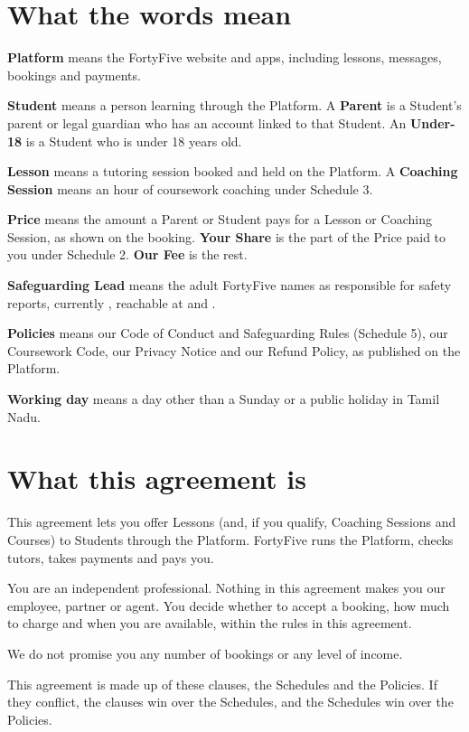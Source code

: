 \documentclass[11pt]{article}
\begin{document}
\section{What the words mean}

\begin{clauses}
  \item \textbf{Platform} means the FortyFive website and apps, including lessons, messages, bookings and payments.
  \item \textbf{Student} means a person learning through the Platform. A \textbf{Parent} is a Student's parent or legal guardian who has an account linked to that Student. An \textbf{Under-18} is a Student who is under 18 years old.
  \item \textbf{Lesson} means a tutoring session booked and held on the Platform. A \textbf{Coaching Session} means an hour of coursework coaching under Schedule 3.
  \item \textbf{Price} means the amount a Parent or Student pays for a Lesson or Coaching Session, as shown on the booking. \textbf{Your Share} is the part of the Price paid to you under Schedule 2. \textbf{Our Fee} is the rest.
  \item \textbf{Safeguarding Lead} means the adult FortyFive names as responsible for safety reports, currently , reachable at  and .
  \item \textbf{Policies} means our Code of Conduct and Safeguarding Rules (Schedule 5), our Coursework Code, our Privacy Notice and our Refund Policy, as published on the Platform.
  \item \textbf{Working day} means a day other than a Sunday or a public holiday in Tamil Nadu.
\end{clauses}

\section{What this agreement is}

\begin{clauses}
  \item This agreement lets you offer Lessons (and, if you qualify, Coaching Sessions and Courses) to Students through the Platform. FortyFive runs the Platform, checks tutors, takes payments and pays you.
  \item You are an independent professional. Nothing in this agreement makes you our employee, partner or agent. You decide whether to accept a booking, how much to charge and when you are available, within the rules in this agreement.
  \item We do not promise you any number of bookings or any level of income.
  \item This agreement is made up of these clauses, the Schedules and the Policies. If they conflict, the clauses win over the Schedules, and the Schedules win over the Policies.
\end{clauses}
\end{document}
